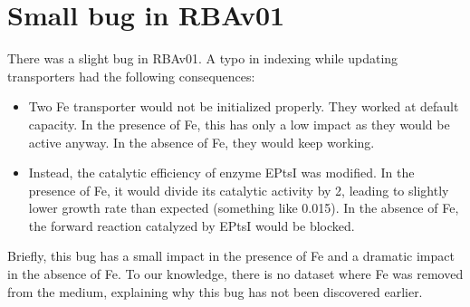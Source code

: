 
\section{Small bug in RBAv01}

There was a slight bug in RBAv01. A typo in indexing while updating transporters
had the following consequences:
\begin{itemize}
\item Two Fe transporter would not be initialized properly. They worked at default capacity. In the presence of Fe, this has only a low impact as they would be active anyway. In the absence of Fe, they would keep working.
\item Instead, the catalytic efficiency of enzyme EPtsI was modified. In the presence of Fe, it would divide its catalytic activity by 2, leading to slightly lower growth rate than expected (something like 0.015). In the absence of Fe, the forward reaction catalyzed by EPtsI would be blocked.
\end{itemize}

Briefly, this bug has a small impact in the presence of Fe and a dramatic impact in the absence of Fe. To our knowledge, there is no dataset where Fe was removed from the medium, explaining why this bug has not been discovered earlier.
